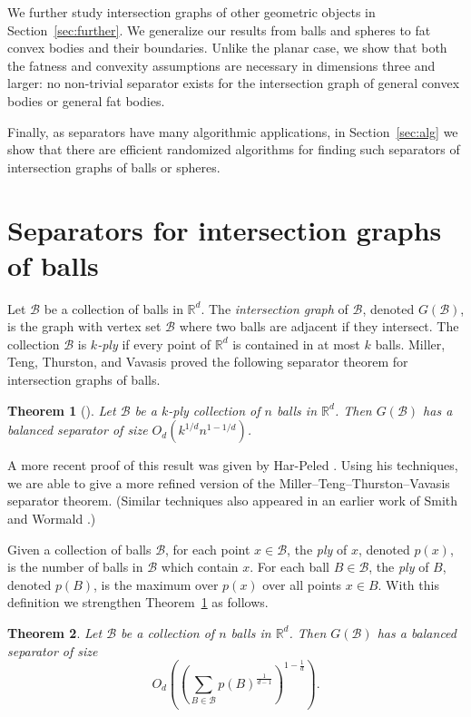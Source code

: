 \documentclass[11pt, reqno]{amsart}
\theoremstyle{plain}
\newtheorem{theorem}{Theorem}
\theoremstyle{definition}
\theoremstyle{remark}
\numberwithin{theorem}{section}
\numberwithin{equation}{section}
\newcommand{\paren}[1]{\left( #1 \right)}
\newcommand{\R}{\mathbb R}
\newcommand{\fB}{\mathcal B}
\begin{document}
We further study intersection graphs of other geometric objects in Section~\ref{sec:further}. We generalize our results from balls and spheres to fat convex bodies and their boundaries. Unlike the planar case, we show that both the fatness and convexity assumptions are necessary in dimensions three and larger: no non-trivial separator exists for the intersection graph of general convex bodies or general fat bodies.

Finally, as separators have many algorithmic applications, in Section~\ref{sec:alg} we show that there are efficient randomized algorithms for finding such separators of intersection graphs of balls or spheres. 

\section{Separators for intersection graphs of balls}
Let $\fB$ be a collection of balls in $\R^d$. The \emph{intersection graph} of $\fB$, denoted $G(\fB)$, is the graph with vertex set $\fB$ where two balls are adjacent if they intersect. The collection $\fB$ is \emph{$k$-ply} if every point of $\R^d$ is contained in at most $k$ balls. Miller, Teng, Thurston, and Vavasis \cite{MTTV97} proved the following separator theorem for intersection graphs of balls.

\begin{theorem}[\cite{MTTV97}]
\label{thm:ball-separator-ply}
Let $\fB$ be a $k$-ply collection of $n$ balls in $\R^d$. Then $G(\fB)$ has a balanced separator of size $O_d(k^{1/d}n^{1-1/d})$.
\end{theorem}

A more recent proof of this result was given by Har-Peled \cite{Har11}. Using his techniques, we are able to give a more refined version of the Miller--Teng--Thurston--Vavasis separator theorem. (Similar techniques also appeared in an earlier work of Smith and Wormald \cite{SW98}.)

Given a collection of balls $\fB$, for each point $x\in\fB$, the \emph{ply} of $x$, denoted $p(x)$, is the number of balls in $\fB$ which contain $x$. For each ball $B\in\fB$, the \emph{ply} of $B$, denoted $p(B)$, is the maximum over $p(x)$ over all points $x\in B$. With this definition we strengthen Theorem~\ref{thm:ball-separator-ply} as follows.

\begin{theorem}
\label{thm:ball-separator-lp}
Let $\fB$ be a collection of $n$ balls in $\R^d$. Then $G(\fB)$ has a balanced separator of size 
\[O_d\paren{\paren{\sum_{B\in\fB}p(B)^{\tfrac1{d-1}}}^{1-\tfrac1d}}.\]
\end{theorem}
\end{document}
